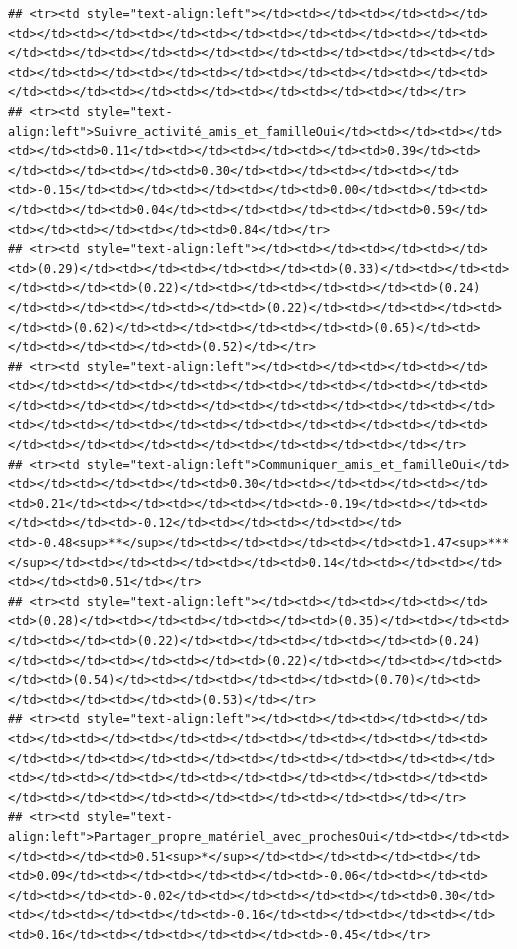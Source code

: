\documentclass[
]{article}
\begin{document}
\begin{verbatim}
## <tr><td style="text-align:left"></td><td></td><td></td><td></td><td></td><td></td><td></td><td></td><td></td><td></td><td></td><td></td><td></td><td></td><td></td><td></td><td></td><td></td><td></td><td></td><td></td><td></td><td></td><td></td><td></td><td></td><td></td><td></td><td></td><td></td><td></td><td></td><td></td></tr>
## <tr><td style="text-align:left">Suivre_activité_amis_et_familleOui</td><td></td><td></td><td></td><td>0.11</td><td></td><td></td><td></td><td>0.39</td><td></td><td></td><td></td><td>0.30</td><td></td><td></td><td></td><td>-0.15</td><td></td><td></td><td></td><td>0.00</td><td></td><td></td><td></td><td>0.04</td><td></td><td></td><td></td><td>0.59</td><td></td><td></td><td></td><td>0.84</td></tr>
## <tr><td style="text-align:left"></td><td></td><td></td><td></td><td>(0.29)</td><td></td><td></td><td></td><td>(0.33)</td><td></td><td></td><td></td><td>(0.22)</td><td></td><td></td><td></td><td>(0.24)</td><td></td><td></td><td></td><td>(0.22)</td><td></td><td></td><td></td><td>(0.62)</td><td></td><td></td><td></td><td>(0.65)</td><td></td><td></td><td></td><td>(0.52)</td></tr>
## <tr><td style="text-align:left"></td><td></td><td></td><td></td><td></td><td></td><td></td><td></td><td></td><td></td><td></td><td></td><td></td><td></td><td></td><td></td><td></td><td></td><td></td><td></td><td></td><td></td><td></td><td></td><td></td><td></td><td></td><td></td><td></td><td></td><td></td><td></td><td></td></tr>
## <tr><td style="text-align:left">Communiquer_amis_et_familleOui</td><td></td><td></td><td></td><td>0.30</td><td></td><td></td><td></td><td>0.21</td><td></td><td></td><td></td><td>-0.19</td><td></td><td></td><td></td><td>-0.12</td><td></td><td></td><td></td><td>-0.48<sup>**</sup></td><td></td><td></td><td></td><td>1.47<sup>***</sup></td><td></td><td></td><td></td><td>0.14</td><td></td><td></td><td></td><td>0.51</td></tr>
## <tr><td style="text-align:left"></td><td></td><td></td><td></td><td>(0.28)</td><td></td><td></td><td></td><td>(0.35)</td><td></td><td></td><td></td><td>(0.22)</td><td></td><td></td><td></td><td>(0.24)</td><td></td><td></td><td></td><td>(0.22)</td><td></td><td></td><td></td><td>(0.54)</td><td></td><td></td><td></td><td>(0.70)</td><td></td><td></td><td></td><td>(0.53)</td></tr>
## <tr><td style="text-align:left"></td><td></td><td></td><td></td><td></td><td></td><td></td><td></td><td></td><td></td><td></td><td></td><td></td><td></td><td></td><td></td><td></td><td></td><td></td><td></td><td></td><td></td><td></td><td></td><td></td><td></td><td></td><td></td><td></td><td></td><td></td><td></td><td></td></tr>
## <tr><td style="text-align:left">Partager_propre_matériel_avec_prochesOui</td><td></td><td></td><td></td><td>0.51<sup>*</sup></td><td></td><td></td><td></td><td>0.09</td><td></td><td></td><td></td><td>-0.06</td><td></td><td></td><td></td><td>-0.02</td><td></td><td></td><td></td><td>0.30</td><td></td><td></td><td></td><td>-0.16</td><td></td><td></td><td></td><td>0.16</td><td></td><td></td><td></td><td>-0.45</td></tr>

\end{verbatim}
\end{document}

